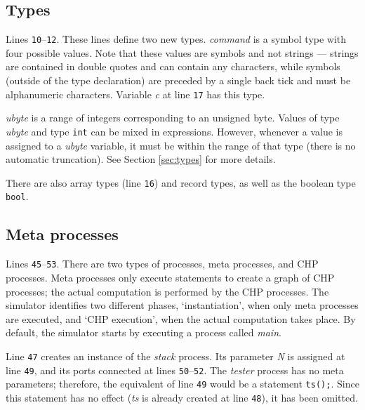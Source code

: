 
\subsection{Types}\label{sec:demotypes}

Lines {\tt{}10}--{\tt{}12}. These lines define two new types. {\it{}command} is a
symbol type with four possible values. Note that these values are symbols
and not strings --- strings are contained in double quotes and can contain any
characters, while symbols (outside of the type declaration) are preceded by a
single back tick and must be alphanumeric characters.  Variable
{\it{}c} at line {\tt{}17} has this type.

{\it{}ubyte} is a range of integers corresponding to an unsigned byte.
Values of type {\it{}ubyte} and type {\tt{}int} can be mixed in expressions. However,
whenever a value is assigned to a {\it{}ubyte} variable, it must be within
the range of that type (there is no automatic truncation). See
Section \ref{sec:types} for more details.

There are also array types (line {\tt{}16}) and record types, as well as
the boolean type {\tt{}bool}.



\subsection{Meta processes}\label{sec:demometa}

Lines {\tt{}45}--{\tt{}53}. There are two types of processes, meta processes,
and CHP processes. Meta processes only
execute statements to create a graph of CHP processes; the actual
computation is performed by the CHP processes. The simulator identifies
two different phases, `instantiation', when only meta processes are
executed, and `CHP execution', when the actual computation takes
place. By default, the simulator starts by executing a process called {\it{}main}.

Line {\tt{}47} creates an instance of the {\it{}stack} process. Its parameter {\it{}N}
is assigned at line {\tt{}49}, and its ports connected at lines {\tt{}50}--{\tt{}52}.
The {\it{}tester} process has no meta parameters; therefore, the equivalent
of line {\tt{}49} would be a statement {\tt{}ts();}. Since this statement has no
effect ({\it{}ts} is already created at line {\tt{}48}), it has been omitted.


